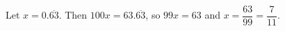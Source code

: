 Let $x=0.\overline{63}$. Then $100x=63.\overline{63}$, so $99x=63$ and $x=\dfrac{63}{99}=\boxed{\dfrac{7}{11}}$.
